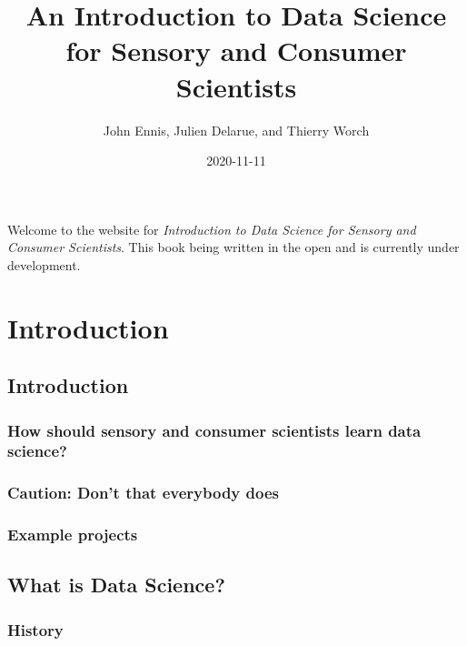 \documentclass[
]{book}
\title{An Introduction to Data Science for Sensory and Consumer Scientists}
\author{John Ennis, Julien Delarue, and Thierry Worch}
\date{2020-11-11}
\begin{document}
\maketitle

{
\setcounter{tocdepth}{1}
\tableofcontents
}
Welcome to the website for \emph{Introduction to Data Science for Sensory and Consumer Scientists}. This book being written in the open and is currently under development.

\hypertarget{part-introduction}{%
\part*{Introduction}\label{part-introduction}}

\hypertarget{intro}{%
\chapter{Introduction}\label{intro}}

\hypertarget{how-should-sensory-and-consumer-scientists-learn-data-science}{%
\section{How should sensory and consumer scientists learn data science?}\label{how-should-sensory-and-consumer-scientists-learn-data-science}}

\hypertarget{caution-dont-that-everybody-does}{%
\section{Caution: Don't that everybody does}\label{caution-dont-that-everybody-does}}

\hypertarget{example-projects}{%
\section{Example projects}\label{example-projects}}

\hypertarget{data_science}{%
\chapter{What is Data Science?}\label{data_science}}

\hypertarget{history}{%
\section{History}\label{history}}
\end{document}

